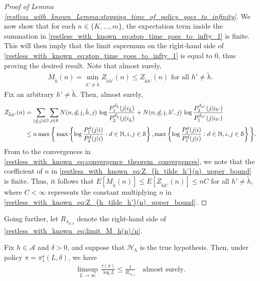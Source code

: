 \begin{proof}[Proof of Lemma \ref{restless_with_known_Lemma:stopping_time_of_policy_goes_to_infinity}]
We now show that for each $n\in\{K,\ldots,m\}$, the expectation term inside the summation in \eqref{restless_with_known_eq:stop_time_goes_to_infty_1} is finite. This will then imply that the limit supremum on the right-hand side of \eqref{restless_with_known_eq:stop_time_goes_to_infty_1} is equal to $0$, thus proving the desired result. Note that almost surely,
\begingroup\allowdisplaybreaks\begin{align}
	M_{\tilde{h}}(n)=\min\limits_{h'\neq \tilde{h}}Z_{\tilde{h}h'}(n)\leq Z_{\tilde{h}h'}(n)\text{ for all }h'\neq \tilde{h}.\label{restless_with_known_eq:mod_glr_upper_bounded_by_glr}
\end{align}\endgroup
Fix an arbitrary $h'\neq \tilde{h}$. Then, almost surely,
\begin{align}
	Z_{\tilde{h}h'}(n)&=\sum\limits_{(\underline{d},\underline{i})\in\mathbb{S}}\sum\limits_{j\in\mathcal{S}}{N(n,\underline{d},\underline{i},\tilde{h},j)}\,\log\frac{P_1^{d_{\tilde{h}}}(j|i_{\tilde{h}})}{P_2^{d_{\tilde{h}}}(j|i_{\tilde{h}})}+{N(n,\underline{d},\underline{i},h',j)}\,\log\frac{P_2^{d_{h'}}(j|i_{h'})}{P_1^{d_{h'}}(j|i_{h'})}\nonumber\\
	&\leq n\max\bigg\lbrace\max\left\lbrace \log\frac{P_1^{d}(j|i)}{P_2^{d}(j|i)}:d\in\mathbb{N},i,j\in\mathcal{S}\right\rbrace, \max\left\lbrace \log\frac{P_2^{d}(j|i)}{P_1^{d}(j|i)}:d\in\mathbb{N},i,j\in\mathcal{S}\right\rbrace\bigg\rbrace.\label{restless_with_known_eq:Z_{h_tilde_h'}(n)_upper_bound}
\end{align}
From to the convergences in \eqref{restless_with_known_eq:convergence_theorem_convergences}, we note that the coefficient of $n$ in  \eqref{restless_with_known_eq:Z_{h_tilde_h'}(n)_upper_bound} is finite. Thus, it follows that $E[M_{\tilde{h}}(n)]\leq E[Z_{\tilde{h}h'}(n)]\leq nC$ for all $h'\neq \tilde{h}$, where $C<\infty$ represents the constant multiplying $n$ in \eqref{restless_with_known_eq:Z_{h_tilde_h'}(n)_upper_bound}.
\end{proof}


Going further, let $R_{\lambda_{h,\delta}}$ denote the right-hand side of \eqref{restless_with_known_eq:limit_M_h(n)/n}.
\begin{lemma}\label{restless_with_known_Lemma:almost_sure_upper_bound_for_policy_pi_star}
Fix $h\in\mathcal{A}$ and $\delta>0$, and suppose that $\mathcal{H}_h$ is the true hypothesis. Then, under policy $\pi=\pi_1^\star(L,\delta)$, we have
\begingroup\allowdisplaybreaks\begin{align}
	\limsup\limits_{L\to\infty}\, \frac{\tau(\pi)}{\log L}\leq  \frac{1}{R_{\lambda_{h,\delta}}}\quad \text{almost surely}.\label{restless_with_known_eq:almost_sure_upper_bound_for_policy_pi_star}
\end{align}\endgroup	
\end{lemma}

